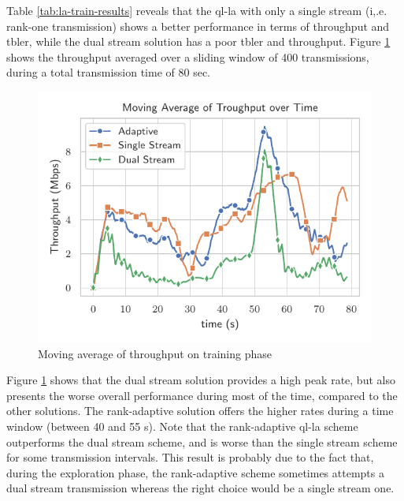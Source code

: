 Table \ref{tab:la-train-results} reveals that the \gls{ql-la} with only a single stream (i,.e. rank-one transmission) shows a better performance in terms of throughput and \gls{tbler}, while the dual stream solution has a poor \gls{tbler} and throughput.
%
Figure \ref{fig:la-train-thr} shows the throughput averaged over a sliding window of 400 transmissions, during a total transmission time of 80 sec.

\begin{figure}[!htbp]
	\centerline{\includegraphics[width=0.6\columnwidth]{figures/chp_la/Thr_Train.pdf}}
	\caption{Moving average of throughput on training phase}
	\label{fig:la-train-thr}
\end{figure}

%


Figure \ref{fig:la-train-thr} shows that the dual stream solution provides a high peak rate, but also presents the worse overall performance during most of the time, compared to the other solutions.
%
The rank-adaptive solution offers the higher rates during a time window (between 40 and 55 s).
%
Note that the rank-adaptive \gls{ql-la} scheme outperforms the dual stream scheme, and is worse than the single stream scheme for some transmission intervals.
%
This result is probably due to the fact that, during the exploration phase, the rank-adaptive scheme sometimes attempts a dual stream transmission whereas the right choice would be a single stream one.

